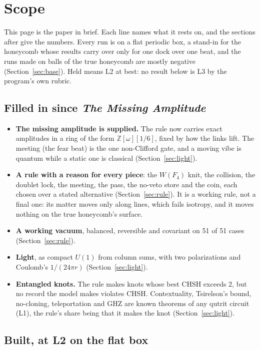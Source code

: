 \section*{Scope}
\label{sec:scope}

This page is the paper in brief. Each line names what it rests on, and the sections after give the numbers. Every
run is on a flat periodic box, a stand-in for the honeycomb whose results carry over only for one dock over one beat,
and the runs made on balls of the true honeycomb are mostly negative (Section~\ref{sec:base}). Held means L2 at best:
no result below is L3 by the program's own rubric.

\subsection*{Filled in since \emph{The Missing Amplitude}}

\begin{itemize}
\item \textbf{The missing amplitude is supplied.} The rule now carries exact amplitudes in a ring of the form
$\mathbb{Z}[\omega][1/6]$, fixed by how the links lift. The meeting (the fear beat) is the one non-Clifford gate, and a
moving vibe is quantum while a static one is classical (Section~\ref{sec:light}).
\item \textbf{A rule with a reason for every piece}: the $W(F_4)$ knit, the collision, the doublet lock, the meeting,
the pass, the no-veto store and the coin, each chosen over a stated alternative (Section~\ref{sec:rule}). It is a
working rule, not a final one: its matter moves only along lines, which fails isotropy, and it moves nothing on
the true honeycomb's surface.
\item \textbf{A working vacuum}, balanced, reversible and covariant on 51 of 51 cases (Section~\ref{sec:rule}).
\item \textbf{Light}, as compact $U(1)$ from column sums, with two polarizations and Coulomb's $1/(24\pi r)$
(Section~\ref{sec:light}).
\item \textbf{Entangled knots.} The rule makes knots whose best CHSH exceeds 2, but no record the model makes violates
CHSH. Contextuality, Tsirelson's bound, no-cloning, teleportation and GHZ are known theorems of any qutrit circuit
(L1), the rule's share being that it makes the knot (Section~\ref{sec:light}).
\end{itemize}

\subsection*{Built, at L2 on the flat box}


